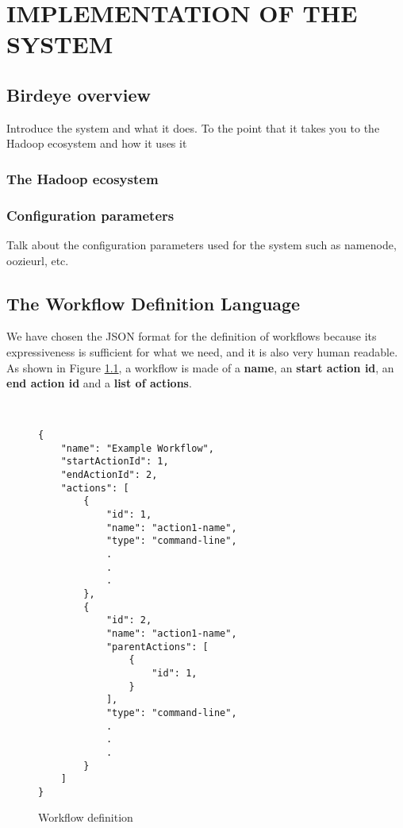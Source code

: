 \chapter{IMPLEMENTATION OF THE SYSTEM}
\label{chap:implementation}
\section{Birdeye overview}
Introduce the system and what it does. To the point that it takes you to the Hadoop ecosystem and
how it uses it
\subsection{The Hadoop ecosystem}
\subsection{Configuration parameters}
Talk about the configuration parameters used for the system such as namenode, oozieurl, etc.

\section{The Workflow Definition Language}
We have chosen the JSON format for the definition of workflows because its expressiveness is sufficient for what we need, and it is also very human readable. As shown in Figure \ref{fig:workflow_definition_language}, a workflow is made of a \textbf{name}, an \textbf{start action id}, an \textbf{end action id} and a \textbf{list of actions}. 

\begin{figure}
\begin{mdframed}
\begin{singlespace}
\begin{verbatim}


{
    "name": "Example Workflow",
    "startActionId": 1,
    "endActionId": 2,
    "actions": [
        {
            "id": 1,
            "name": "action1-name",
            "type": "command-line",
            .
            .
            .
        },
        {
            "id": 2,
            "name": "action1-name",
            "parentActions": [
                { 
                    "id": 1,
                }
            ],
            "type": "command-line",
            .
            .
            .
        }
    ]
}
\end{verbatim}
\end{singlespace}
\end{mdframed}
\caption{Workflow definition}
\label{fig:workflow_definition_language}
\end{figure}

